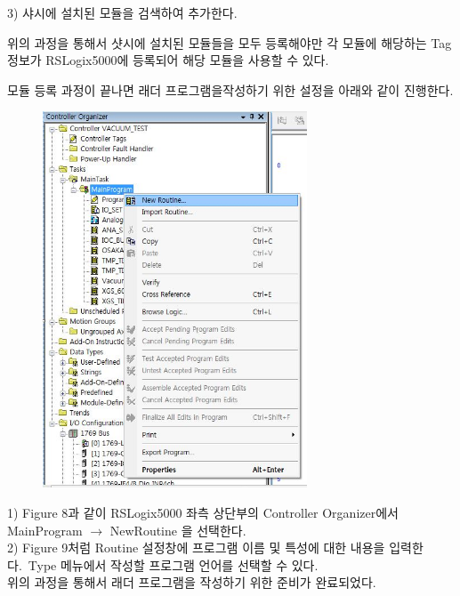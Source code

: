 \documentclass[11pt
  , a4paper
  , article
  , oneside
]{memoir}
\begin{document}
 3) 샤시에 설치된 모듈을 검색하여 추가한다.\\
 
 \newpage
 
 위의 과정을 통해서 샷시에 설치된 모듈들을 모두 등록해야만 각 모듈에 해당하는 Tag 정보가 RSLogix5000에 등록되어 해당 모듈을 사용할 수 있다. \
 
 모듈 등록 과정이 끝나면 래더 프로그램을작성하기 위한 설정을 아래와 같이 진행한다.
 
 
 \newpage
 
 \begin{figure}[h]
 	\centering
 	\includegraphics[width=0.7\textwidth]{./picture/new_routine.JPG}
 	\caption{}
 	\label{fig:}
 \end{figure}  
 
  1) Figure 8과 같이 RSLogix5000 좌측 상단부의 Controller Organizer에서 MainProgram $\rightarrow$ NewRoutine 을 선택한다.\\
  
 2) Figure 9처럼 Routine 설정창에 프로그램 이름 및 특성에 대한 내용을 입력한다.\
 Type 메뉴에서 작성할 프로그램 언어를 선택할 수 있다.\\
 
 위의 과정을 통해서 래더 프로그램을 작성하기 위한 준비가 완료되었다.\\
\end{document}
